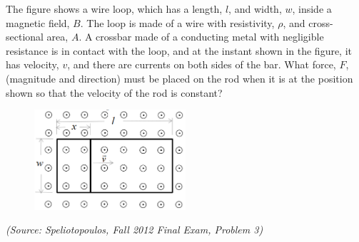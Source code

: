 \documentclass{article}
\begin{document}
The figure shows a wire loop, which has a length, $l$, and width, $w$, inside a magnetic field, $B$. The loop is made of a wire with resistivity, $\rho$, and cross-sectional area, $A$. A crossbar made of a conducting metal with negligible resistance is in contact with the loop, and at the instant shown in the figure, it has velocity, $v$, and there are currents on both sides of the bar. What force, $F$, (magnitude and direction) must be placed on the rod when it is at the position shown so that the velocity of the rod is constant?
\begin{figure}[h]
	\begin{center}
		\includegraphics[width=0.5\textwidth]{wireloops.png}
	\end{center}
\end{figure}

\textit{(Source: Speliotopoulos, Fall 2012 Final Exam, Problem 3)}
\end{document}
